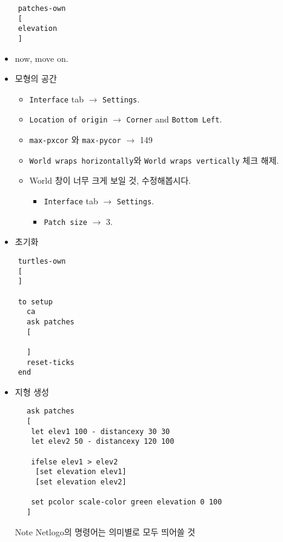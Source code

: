 \documentclass[hyperref={unicode}]{beamer}
\begin{document}
\begin{frame}[fragile]
	\begin{verbatim}
	patches-own
	[
	elevation
	]
	\end{verbatim}
\begin{itemize}
\item now, move on.
\item 모형의 공간
	\begin{itemize}
	\item \verb|Interface| tab $\rightarrow$ \verb|Settings|.
	\item \verb|Location of origin| $\rightarrow$  \verb|Corner| and \verb|Bottom Left|.
	\item \verb|max-pxcor| 와 \verb|max-pycor| $\rightarrow$ 149
	\item \verb|World wraps horizontally|와 \verb|World wraps vertically| 체크 해제.
	\item World 창이 너무 크게 보일 것, 수정해봅시다.
		\begin{itemize}
		\item \verb|Interface| tab $\rightarrow$ \verb|Settings|.
		\item \verb|Patch size| $\rightarrow$ 3.
		\end{itemize}
	\end{itemize}
\end{itemize}	
\end{frame}

\begin{frame}[fragile]
\begin{itemize}
\item 초기화
\end{itemize}
	\begin{verbatim}
	turtles-own
	[
	]

	to setup
	  ca
	  ask patches
	  [

	  ]
	  reset-ticks
	end
	\end{verbatim}
\end{frame}

\begin{frame}[fragile]
\begin{itemize}
\item 지형 생성
\end{itemize}
	\begin{verbatim}
	  ask patches
	  [
	   let elev1 100 - distancexy 30 30
	   let elev2 50 - distancexy 120 100

	   ifelse elev1 > elev2
	    [set elevation elev1]
	    [set elevation elev2]

	   set pcolor scale-color green elevation 0 100
	  ]
	\end{verbatim}
	\begin{itemize}
	\item[Note] Netlogo의 명령어는 의미별로 모두 띄어쓸 것 
	\end{itemize}
\end{frame}
\end{document}
